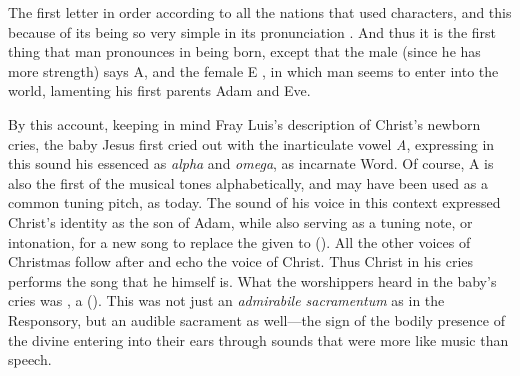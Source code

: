 \begin{quoting}
The first letter in order according to all the nations that used characters,
\Dots{} and this because of its being so very simple in its pronunciation
. \Dots{} 
    And thus it is the first thing that man pronounces in
being born, except that the male (since he has more strength) says A, and the
female E , in which man seems to enter into the world,
lamenting his first parents Adam and Eve.%
\Autocites
    [:
    .]
    {Covarrubias:Tesoro}
    [On symbolic alphabets in early modern devotional music, see][38--40]
    {Kendrick:Jeremiah}
\end{quoting}
By this account, keeping in mind Fray Luis's description of Christ's newborn
cries, the baby Jesus first cried out with the inarticulate vowel \emph{A},
expressing in this sound his essenced as \emph{alpha} and \emph{omega}, as
incarnate Word.
Of course, A is also the first of the musical tones alphabetically, and may have
been used as a common tuning pitch, as today.
The sound of his voice in this context expressed Christ's identity as the son of
Adam, while also serving as a tuning note, or intonation, for a new song to
replace the  given to 
().
All the other voices of Christmas follow after and echo the voice of Christ.
Thus Christ in his cries performs the song that he himself is.
What the worshippers heard in the baby's cries was , a  ().
This was not just an \emph{admirabile sacramentum} as in the Responsory, but an
audible sacrament as well---the sign of the bodily presence of the divine
entering into their ears through sounds that were more like music than speech.

